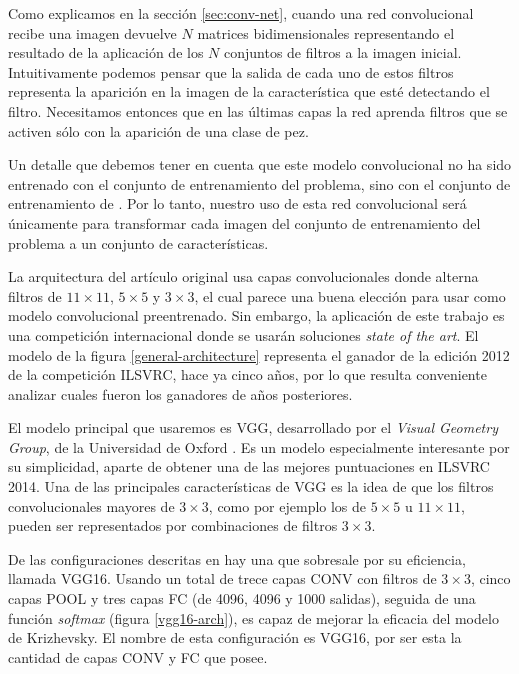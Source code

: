 Como explicamos en la sección \ref{sec:conv-net}, cuando una red convolucional
recibe una imagen devuelve $N$ matrices bidimensionales representando el
resultado de la aplicación de los $N$ conjuntos de filtros a la imagen inicial.
Intuitivamente podemos pensar que la salida de cada uno de estos filtros
representa la aparición en la imagen de la característica que esté detectando
el filtro. Necesitamos entonces que en las últimas capas la red aprenda
filtros que se activen sólo con la aparición de una clase de pez.

Un detalle que debemos tener en cuenta que este modelo convolucional no ha sido entrenado con el conjunto de entrenamiento del problema, sino con el conjunto de entrenamiento de \cite{imagenet}. Por lo tanto, nuestro uso de esta red convolucional será únicamente para transformar cada imagen del conjunto de entrenamiento del problema a un conjunto de características.

La arquitectura del artículo original \parencite{krizhevsky2012imagenet} usa
capas convolucionales donde alterna filtros de $11\times11$, $5\times5$ y
$3\times3$, el cual parece una buena elección para usar como modelo
convolucional preentrenado. Sin embargo, la aplicación de este trabajo es una
competición internacional donde se usarán soluciones \textit{state of the art}.
El modelo de la figura \ref{general-architecture} representa el ganador de la
edición 2012 de la competición ILSVRC, hace ya cinco años, por lo que resulta
conveniente analizar cuales fueron los ganadores de años posteriores.

El modelo principal que usaremos es VGG, desarrollado por el \textit{Visual
Geometry Group}, de la Universidad de Oxford \parencite{simonyan}. Es un modelo
especialmente interesante por su simplicidad, aparte de obtener una de las
mejores puntuaciones en ILSVRC 2014. Una de las principales características de
VGG es la idea de que los filtros convolucionales mayores de $3\times3$, como
por ejemplo los de $5\times5$ u $11\times11$, pueden ser representados por
combinaciones de filtros $3\times3$.

De las configuraciones descritas en \parencite{simonyan} hay una que sobresale
por su eficiencia, llamada VGG16. Usando un total de trece capas CONV con
filtros de $3\times3$, cinco capas POOL y tres capas FC (de 4096, 4096 y 1000
salidas), seguida de una función \textit{softmax} (figura \ref{vgg16-arch}), es
capaz de mejorar la eficacia del modelo de Krizhevsky. El nombre de esta
configuración es VGG16, por ser esta la cantidad de capas CONV y FC que posee.

